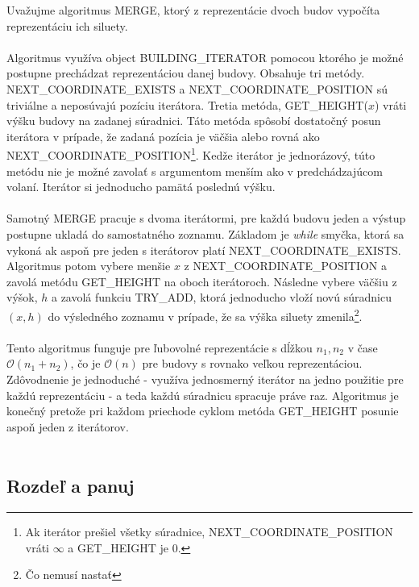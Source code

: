 \documentclass[paper=a4, fontsize=11pt]{scrartcl} %
\numberwithin{equation}{section} %
\numberwithin{figure}{section} %
\numberwithin{table}{section} %
\begin{document}
Uvažujme algoritmus MERGE, ktorý z reprezentácie dvoch budov vypočíta reprezentáciu ich siluety. \\
\\
Algoritmus využíva object BUILDING\_ITERATOR pomocou ktorého je možné postupne prechádzat reprezentáciou danej budovy. Obsahuje tri  metódy. \\
NEXT\_COORDINATE\_EXISTS a NEXT\_COORDINATE\_POSITION sú triviálne a neposúvajú pozíciu iterátora. Tretia metóda, GET\_HEIGHT($x$) vráti výšku budovy na zadanej súradnici. Táto metóda spôsobí dostatočný posun iterátora v prípade, že zadaná pozícia je väčšia alebo rovná ako NEXT\_COORDINATE\_POSITION\footnote{Ak iterátor prešiel všetky súradnice, NEXT\_COORDINATE\_POSITION vráti $\infty$ a GET\_HEIGHT je 0.}. Kedže iterátor je jednorázový, túto metódu nie je možné zavolať s argumentom menším ako v predchádzajúcom volaní. Iterátor si jednoducho pamätá poslednú výšku. \\
\\
Samotný MERGE pracuje s dvoma iterátormi, pre každú budovu jeden a výstup postupne ukladá do samostatného zoznamu. Základom je {\em while} smyčka, ktorá sa vykoná ak aspoň pre jeden s iterátorov platí NEXT\_COORDINATE\_EXISTS.
Algoritmus potom vybere menšie $x$ z NEXT\_COORDINATE\_POSITION a zavolá metódu GET\_HEIGHT na oboch iterátoroch. Následne vybere väčšiu z výšok, $h$ a zavolá funkciu TRY\_ADD, ktorá jednoducho vloží novú súradnicu $(x, h)$ do výsledného zoznamu v prípade, že sa výška siluety zmenila\footnote{Čo nemusí nastať}. \\
\\
Tento algoritmus funguje pre ľubovolné reprezentácie s dĺžkou $n_1, n_2$ v čase $\mathcal{O}(n_1 + n_2)$, čo je $\mathcal{O}(n)$ pre budovy s rovnako veľkou reprezentáciou. Zdôvodnenie je jednoduché - využíva jednosmerný iterátor na jedno použitie pre  každú reprezentáciu - a teda každú súradnicu spracuje práve raz. Algoritmus je konečný pretože pri každom priechode cyklom metóda GET\_HEIGHT posunie aspoň jeden z iterátorov. \\
\\

\subsection*{Rozdeľ a panuj}
\end{document}
